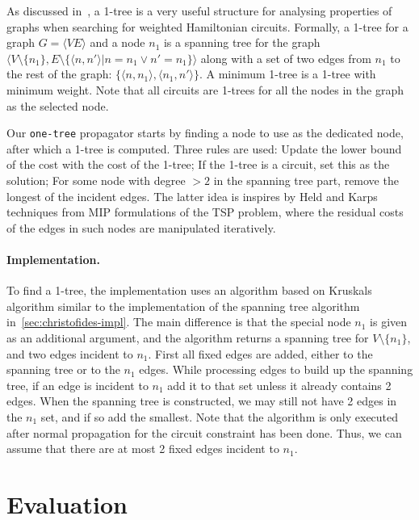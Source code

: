 \documentclass[runningheads]{llncs}
\newcommand{\cons}[1]{\texttt{#1}}
\begin{document}
As discussed in~\cite{HeldKarp71,Benchimol12,Isoart19}, a 1-tree is a
very useful structure for analysing properties of graphs when
searching for weighted Hamiltonian circuits.  Formally, a 1-tree for a
graph $G=\langle V E\rangle$ and a node $n_1$ is a spanning tree for
the graph
$\langle V\setminus \{n_1\}, E\setminus \{\langle n, n' \rangle |
n=n_1\lor n'=n_1\}\rangle$ along with a set of two edges from $n_1$ to
the rest of the graph:
$\{\langle n,n_1 \rangle, \langle n_1,n' \rangle \}$. A minimum 1-tree
is a 1-tree with minimum weight. Note that all circuits are 1-trees
for all the nodes in the graph as the selected node.

Our \cons{one-tree} propagator starts by finding a node to use as the
dedicated node, after which a 1-tree is computed. Three rules are
used: Update the lower bound of the cost with the cost of the 1-tree;
If the 1-tree is a circuit, set this as the solution; For some
node with degree $>2$ in the spanning tree part, remove the longest of
the incident edges. The latter idea is inspires by Held and
Karps~\cite{HeldKarp71} techniques from MIP formulations of the TSP
problem, where the residual costs of the edges in such nodes are
manipulated iteratively.

\label{sec:onetree-impl}

\paragraph{Implementation.} To find a 1-tree, the implementation uses an algorithm based on
Kruskals algorithm  similar to the implementation of
the spanning tree algorithm in~\ref{sec:christofides-impl}. The main
difference is that the special node $n_1$ is given as an additional
argument, and the algorithm returns a spanning tree for $V\setminus
\{n_1\}$, and two edges incident to $n_1$. First all fixed edges are
added, either to the spanning tree or to the $n_1$ edges. While
processing edges to build up the spanning tree, if an edge is incident
to $n_1$ add it to that set unless it already contains 2 edges. When
the spanning tree is constructed, we may still not have 2 edges in the
$n_1$ set, and if so add the smallest.
Note that the algorithm is only executed after normal propagation for
the circuit constraint has been done. Thus, we can assume that there
are at most 2 fixed edges incident to $n_1$.

\section{Evaluation}
\label{sec:evaluation}
\end{document}
